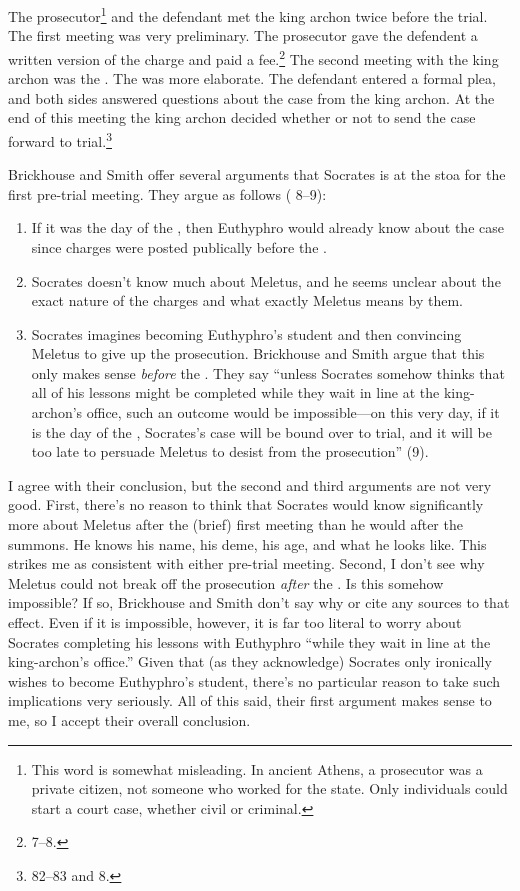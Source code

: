 \documentclass[11pt]{article}
\begin{document}
The prosecutor\footnote{This word is somewhat misleading.  In ancient Athens, a prosecutor was a private citizen, not someone who worked for the state.  Only individuals could start a court case, whether civil or criminal.} and the defendant met the king archon twice before the trial.  The first meeting was very preliminary.  The prosecutor gave the defendent a written version of the charge and paid a fee.\footnote {\citet{brickhouse2004} 7--8.}  The second meeting with the king archon was the .  The  was more elaborate.  The defendant entered a formal plea, and both sides answered questions about the case from the king archon.  At the end of this meeting the king archon decided whether or not to send the case forward to trial.\footnote {\citet{burnet1924} 82--83 and \citet{brickhouse2004} 8.}

Brickhouse and Smith offer several arguments that Socrates is at the stoa for the first pre-trial meeting.  They argue as follows (\citet{brickhouse2004} 8--9):
\begin{enumerate}
    \item If it was the day of the , then Euthyphro would already know about the case since charges were posted publically before the .
    \item Socrates doesn't know much about Meletus, and he seems unclear about the exact nature of the charges and what exactly Meletus means by them.
    \item Socrates imagines becoming Euthyphro's student and then convincing Meletus to give up the prosecution.  Brickhouse and Smith argue that this only makes sense \textit{before} the .  They say ``unless Socrates somehow thinks that all of his lessons might be completed while they wait in line at the king-archon's office, such an outcome would be impossible---on this very day, if it is the day of the , Socrates's case will be bound over to trial, and it will be too late to persuade Meletus to desist from the prosecution'' (9).
\end{enumerate}

I agree with their conclusion, but the second and third arguments are not very good.  First, there's no reason to think that Socrates would know significantly more about Meletus after the (brief) first meeting than he would after the summons.  He knows his name, his deme, his age, and what he looks like.  This strikes me as consistent with either pre-trial meeting.  Second, I don't see why Meletus could not break off the prosecution \textit{after} the .  Is this somehow impossible? If so, Brickhouse and Smith don't say why or cite any sources to that effect.  Even if it is impossible, however, it is far too literal to worry about Socrates completing his lessons with Euthyphro ``while they wait in line at the king-archon's office.'' Given that (as they acknowledge) Socrates only ironically wishes to become Euthyphro's student, there's no particular reason to take such implications very seriously.  All of this said, their first argument makes sense to me, so I accept their overall conclusion.
\end{document}
